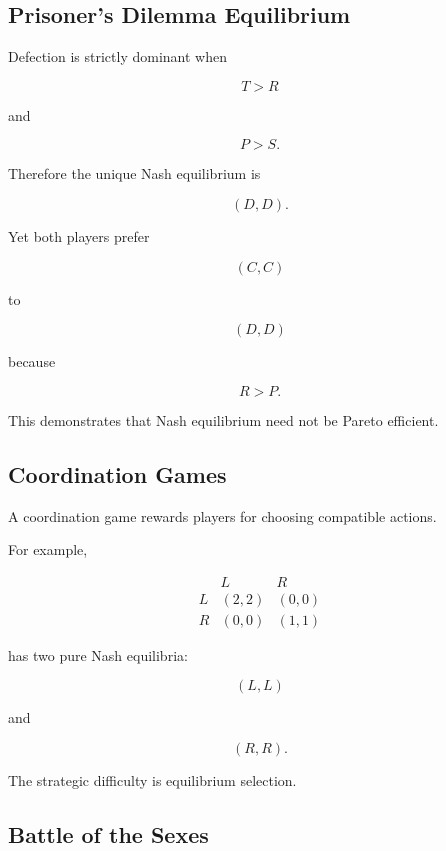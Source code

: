 \subsection{Prisoner's Dilemma Equilibrium}
\label{subsec:prisoners-dilemma-equilibrium}

Defection is strictly dominant when

\[
T>R
\]

and

\[
P>S.
\]

Therefore the unique Nash equilibrium is

\[
\boxed{
(D,D).
}
\]

Yet both players prefer

\[
(C,C)
\]

to

\[
(D,D)
\]

because

\[
R>P.
\]

This demonstrates that Nash equilibrium need not be Pareto efficient.

\subsection{Coordination Games}
\label{subsec:coordination-games}

A coordination game rewards players for choosing compatible actions.

For example,

\[
\begin{array}{c|cc}
&
L
&
R
\\
\hline
L
&
(2,2)
&
(0,0)
\\
R
&
(0,0)
&
(1,1)
\end{array}
\]

has two pure Nash equilibria:

\[
\boxed{
(L,L)
}
\]

and

\[
\boxed{
(R,R).
}
\]

The strategic difficulty is equilibrium selection.

\subsection{Battle of the Sexes}
\label{subsec:battle-of-the-sexes}

